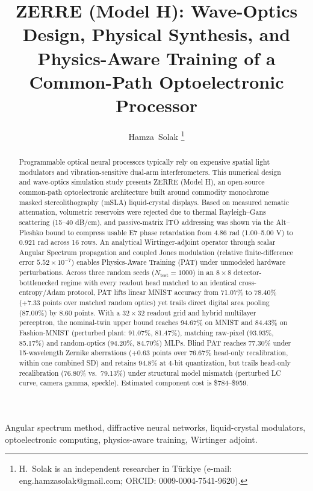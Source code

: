 \documentclass[journal]{IEEEtran}
\title{ZERRE (Model H): Wave-Optics Design, Physical Synthesis, and Physics-Aware Training of a Common-Path Optoelectronic Processor}
\author{Hamza~Solak%
\thanks{H.~Solak is an independent researcher in T\"urkiye (e-mail: eng.hamzasolak@gmail.com; ORCID: 0009-0004-7541-9620).}}
\begin{document}
\maketitle

\begin{abstract}
Programmable optical neural processors typically rely on expensive spatial light modulators and vibration-sensitive dual-arm interferometers. This numerical design and wave-optics simulation study presents ZERRE (Model H), an open-source common-path optoelectronic architecture built around commodity monochrome masked stereolithography (mSLA) liquid-crystal displays. Based on measured nematic attenuation, volumetric reservoirs were rejected due to thermal Rayleigh--Gans scattering (15--40 dB/cm), and passive-matrix ITO addressing was shown via the Alt--Pleshko bound to compress usable E7 phase retardation from 4.86 rad (1.00--5.00 V) to 0.921 rad across 16 rows. An analytical Wirtinger-adjoint operator through scalar Angular Spectrum propagation and coupled Jones modulation (relative finite-difference error $5.52\times 10^{-7}$) enables Physics-Aware Training (PAT) under unmodeled hardware perturbations. Across three random seeds ($N_{\mathrm{test}}=1000$) in an $8\times 8$ detector-bottlenecked regime with every readout head matched to an identical cross-entropy/Adam protocol, PAT lifts linear MNIST accuracy from 71.07\% to 78.40\% (+7.33 points over matched random optics) yet trails direct digital area pooling (87.00\%) by 8.60 points. With a $32\times 32$ readout grid and hybrid multilayer perceptron, the nominal-twin upper bound reaches 94.67\% on MNIST and 84.43\% on Fashion-MNIST (perturbed plant: 91.07\%, 81.47\%), matching raw-pixel (93.93\%, 85.17\%) and random-optics (94.20\%, 84.70\%) MLPs. Blind PAT reaches 77.30\% under 15-wavelength Zernike aberrations (+0.63 points over 76.67\% head-only recalibration, within one combined SD) and retains 94.8\% at 4-bit quantization, but trails head-only recalibration (76.80\% vs.\ 79.13\%) under structural model mismatch (perturbed LC curve, camera gamma, speckle). Estimated component cost is \$784--\$959.
\end{abstract}

\begin{IEEEkeywords}
Angular spectrum method, diffractive neural networks, liquid-crystal modulators, optoelectronic computing, physics-aware training, Wirtinger adjoint.
\end{IEEEkeywords}

\end{document}
